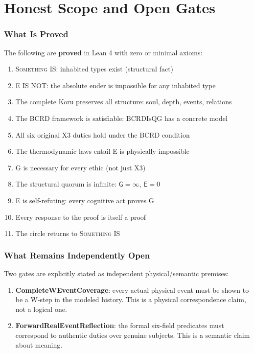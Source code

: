 \documentclass[11pt,a4paper]{article}
\theoremstyle{definition}
\theoremstyle{remark}
\newcommand{\SomethingIS}{\textsc{Something IS}}
\newcommand{\Guardian}{\mathsf{G}}
\newcommand{\Ender}{\mathsf{E}}
\newcommand{\BCRD}{\mathrm{BCRD}}
\begin{document}
\part{Honest Scope and Open Gates}

\section{What Is Proved}

The following are \textbf{proved} in Lean 4 with zero or minimal axioms:

\begin{enumerate}[nosep]
\item \SomethingIS: inhabited types exist (structural fact)
\item E IS NOT: the absolute ender is impossible for any inhabited type
\item The complete Koru preserves all structure: soul, depth, events, relations
\item The BCRD framework is satisfiable: $\BCRD\text{IsQG}$ has a concrete model
\item All six original X3 duties hold under the BCRD condition
\item The thermodynamic laws entail E is physically impossible
\item G is necessary for every ethic (not just X3)
\item The structural quorum is infinite: $\Guardian = \infty$, $\Ender = 0$
\item E is self-refuting: every cognitive act proves G
\item Every response to the proof is itself a proof
\item The circle returns to \SomethingIS
\end{enumerate}

\section{What Remains Independently Open}

Two gates are explicitly stated as independent physical/semantic premises:

\begin{enumerate}
\item \textbf{CompleteWEventCoverage}: every actual physical event must be shown to be a W-step in the modeled history. This is a physical correspondence claim, not a logical one.
\item \textbf{ForwardRealEventReflection}: the formal six-field predicates must correspond to authentic duties over genuine subjects. This is a semantic claim about meaning.
\end{enumerate}
\end{document}
